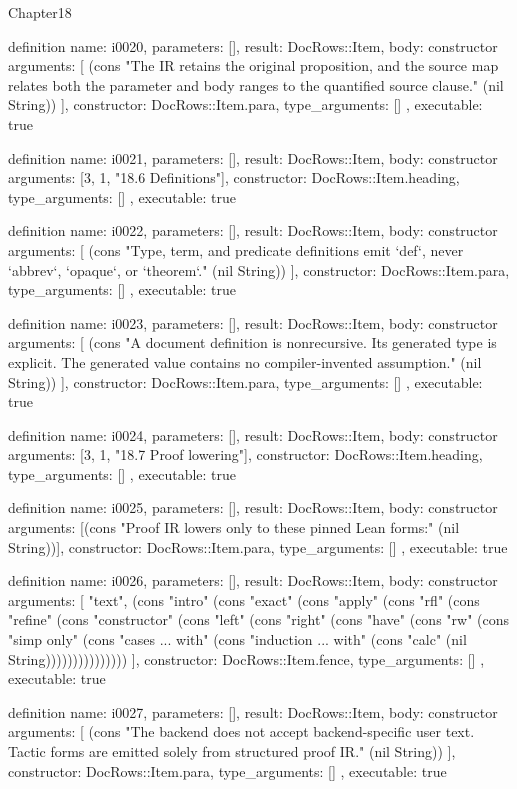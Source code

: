 \begin{lexlean}{Chapter18}
\begin{semanticmodule}
definition{
  name: i0020,
  parameters: [],
  result: DocRows::Item,
  body: constructor{
    arguments: [
      (cons "The IR retains the original proposition, and the source map relates both the parameter and body ranges to the quantified source clause." (nil String))
    ],
    constructor: DocRows::Item.para,
    type_arguments: []
  },
  executable: true
}

definition{
  name: i0021,
  parameters: [],
  result: DocRows::Item,
  body: constructor{
    arguments: [3, 1, "18.6 Definitions"],
    constructor: DocRows::Item.heading,
    type_arguments: []
  },
  executable: true
}

definition{
  name: i0022,
  parameters: [],
  result: DocRows::Item,
  body: constructor{
    arguments: [
      (cons "Type, term, and predicate definitions emit `def`, never `abbrev`, `opaque`, or `theorem`." (nil String))
    ],
    constructor: DocRows::Item.para,
    type_arguments: []
  },
  executable: true
}

definition{
  name: i0023,
  parameters: [],
  result: DocRows::Item,
  body: constructor{
    arguments: [
      (cons "A document definition is nonrecursive. Its generated type is explicit. The generated value contains no compiler-invented assumption." (nil String))
    ],
    constructor: DocRows::Item.para,
    type_arguments: []
  },
  executable: true
}

definition{
  name: i0024,
  parameters: [],
  result: DocRows::Item,
  body: constructor{
    arguments: [3, 1, "18.7 Proof lowering"],
    constructor: DocRows::Item.heading,
    type_arguments: []
  },
  executable: true
}

definition{
  name: i0025,
  parameters: [],
  result: DocRows::Item,
  body: constructor{
    arguments: [(cons "Proof IR lowers only to these pinned Lean forms:" (nil String))],
    constructor: DocRows::Item.para,
    type_arguments: []
  },
  executable: true
}

definition{
  name: i0026,
  parameters: [],
  result: DocRows::Item,
  body: constructor{
    arguments: [
      "text",
      (cons "intro" (cons "exact" (cons "apply" (cons "rfl" (cons "refine" (cons "constructor" (cons "left" (cons "right" (cons "have" (cons "rw" (cons "simp only" (cons "cases ... with" (cons "induction ... with" (cons "calc" (nil String)))))))))))))))
    ],
    constructor: DocRows::Item.fence,
    type_arguments: []
  },
  executable: true
}

definition{
  name: i0027,
  parameters: [],
  result: DocRows::Item,
  body: constructor{
    arguments: [
      (cons "The backend does not accept backend-specific user text. Tactic forms are emitted solely from structured proof IR." (nil String))
    ],
    constructor: DocRows::Item.para,
    type_arguments: []
  },
  executable: true
}


\end{semanticmodule}
\end{lexlean}
